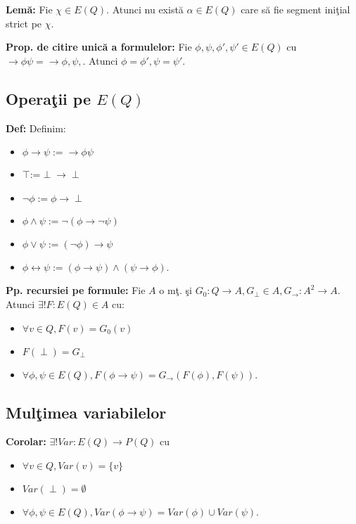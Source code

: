 \documentclass{article}
\begin{document}
\textbf{Lem\u a:} Fie $\chi\in E(Q)$. Atunci nu exist\u a $\alpha\in E(Q)$ care s\u a fie segment ini\c tial strict pe $\chi$.

\textbf{Prop. de citire unic\u a a formulelor:} Fie $\phi,\psi,\phi',\psi'\in E(Q)$ cu $\rightarrow \phi\psi=\rightarrow\phi,\psi,$. Atunci $\phi=\phi',\psi=\psi'$.

\subsection{Opera\c tii pe $E(Q)$}

\textbf{Def:} Definim:
\begin{itemize}
    \item $\phi\rightarrow\psi:=\rightarrow \phi\psi$
    \item $\top$:=$\perp\rightarrow\perp$
    \item $\neg\phi:=\phi\rightarrow\perp$
    \item $\phi\land\psi:=\neg(\phi\rightarrow\neg\psi)$
    \item $\phi\lor\psi:=(\neg\phi)\rightarrow\psi$
    \item $\phi\leftrightarrow \psi:=(\phi\rightarrow\psi)\land(\psi\rightarrow\phi)$.
\end{itemize}

\textbf{Pp. recursiei pe formule:} Fie $A$ o m\c t. \c si $G_0:Q\rightarrow A,G_\perp\in A,G_\rightarrow:A^2\rightarrow A$. Atunci $\exists! F:E(Q)\in A$ cu:
\begin{itemize}
    \item $\forall v\in Q, F(v)=G_0(v)$
    \item $F(\perp)=G_\perp$
    \item $\forall \phi,\psi \in E(Q), F(\phi\rightarrow\psi)=G_\rightarrow(F(\phi),F(\psi))$.
\end{itemize}

\subsection{Mul\c timea variabilelor}

\textbf{Corolar:} $\exists! Var:E(Q)\rightarrow P(Q)$ cu
\begin{itemize}
    \item $\forall v\in Q, Var(v)=\{v\}$
    \item $Var(\perp)=\emptyset$
    \item $\forall\phi,\psi \in E(Q), Var(\phi\rightarrow\psi)=Var(\phi)\cup Var(\psi)$.
\end{itemize}
\end{document}
